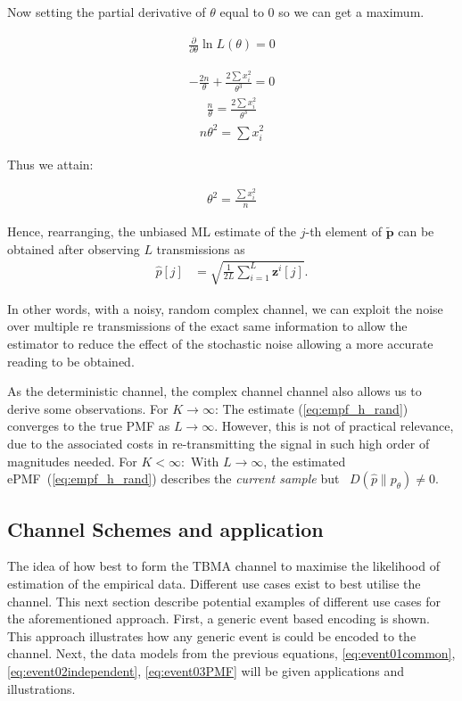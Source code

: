 \documentclass{article}
\begin{document}
Now setting the partial  derivative of $\theta$ equal to $0$ so we can get a maximum.

\begin{align}
    \frac{\partial }{\partial \theta}\ln L{(\theta)} = 0
\end{align}

\begin{align}
    -\frac{2n}{\theta} + \frac{2\sum x_{i}^2}{\theta^3} = 0
\end{align}
\begin{align}
    \frac{n}{\theta} = \frac{2\sum x_{i}^2}{\theta^3}
\end{align}
\begin{align}
   n\theta^2= \sum x_{i}^2
\end{align}

Thus we attain:

\begin{align}
    \theta^2 = \frac{\sum x_{i}^2}{n}
\end{align}


Hence, rearranging, the unbiased ML estimate of the $j$-th element of $\tilde{\boldsymbol{p}}$ can be obtained after observing $L$ transmissions as
%
\begin{align}
    \hat{p}[j] &= \sqrt{\frac{1}{2L} \sum_{i = 1}^{L}\boldsymbol{z}^i[j]}.\label{eq:empf_h_rand}
\end{align}

In other words, with a noisy, random complex channel, we can exploit the noise over multiple re transmissions of the exact same information to allow the estimator to reduce the effect of the stochastic noise allowing a more accurate reading to be obtained. 

As the deterministic channel, the complex channel channel also allows us to derive some observations. For $K \rightarrow \infty$: The estimate (\ref{eq:empf_h_rand}) converges to the true PMF as $L \rightarrow \infty$. However, this is not of practical relevance, due to the associated costs in re-transmitting the signal in such high order of magnitudes needed. For $K <\infty:$ With $L \rightarrow \infty$, the estimated ePMF~(\ref{eq:empf_h_rand}) describes the \emph{current sample} but ~$D(\hat{p}\| p_{\theta}) \neq 0$. 

\subsection{Channel Schemes and application} \label{schemas_and_channels}
The idea of how best to form the TBMA channel to maximise the likelihood of estimation of the empirical data. Different use cases exist to best utilise the channel. This next section describe potential examples of different use cases for the aforementioned approach. First, a generic event based encoding is shown. This approach illustrates how any generic event is could be encoded to the channel. Next, the data models from the previous equations, \ref{eq:event01common},\ref{eq:event02independent}, \ref{eq:event03PMF} will be given applications and illustrations.  
\end{document}
